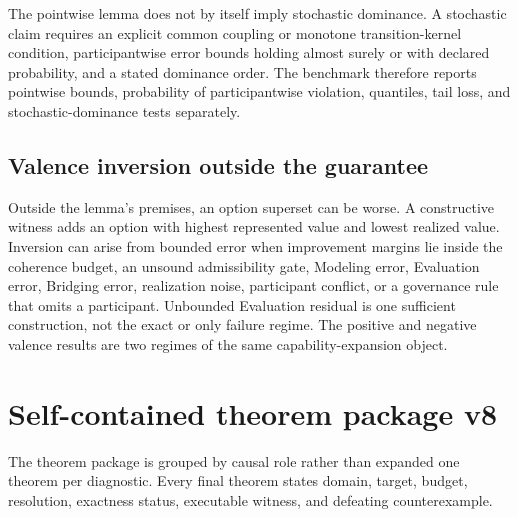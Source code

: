 \documentclass[11pt]{article}
\begin{document}
The pointwise lemma does not by itself imply stochastic dominance. A stochastic claim requires an explicit common coupling or monotone transition-kernel condition, participantwise error bounds holding almost surely or with declared probability, and a stated dominance order. The benchmark therefore reports pointwise bounds, probability of participantwise violation, quantiles, tail loss, and stochastic-dominance tests separately.

\subsection{Valence inversion outside the guarantee}

Outside the lemma's premises, an option superset can be worse. A constructive witness adds an option with highest represented value and lowest realized value. Inversion can arise from bounded error when improvement margins lie inside the coherence budget, an unsound admissibility gate, Modeling error, Evaluation error, Bridging error, realization noise, participant conflict, or a governance rule that omits a participant. Unbounded Evaluation residual is one sufficient construction, not the exact or only failure regime. The positive and negative valence results are two regimes of the same capability-expansion object.

\section{Self-contained theorem package v8}

The theorem package is grouped by causal role rather than expanded one theorem per diagnostic. Every final theorem states domain, target, budget, resolution, exactness status, executable witness, and defeating counterexample.
\end{document}
